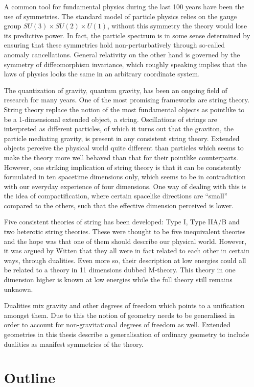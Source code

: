 A common tool for fundamental physics during the last 100 years have been the use of symmetries. The standard model of particle physics relies on the gauge group $SU(3)\times SU(2)\times U(1)$, without this symmetry the theory would lose its predictive power. In fact, the particle spectrum is in some sense determined by ensuring that these symmetries hold non-perturbatively through so-called anomaly cancellations. General relativity on the other hand is governed by the symmetry of diffeomorphism invariance, which roughly speaking implies that the laws of physics looks the same in an arbitrary coordinate system. 

The quantization of gravity, quantum gravity, has been an ongoing field of research for many years. One of the most promising frameworks are string theory. String theory replace the notion of the most fundamental objects as pointlike to be a 1-dimensional extended object, a string. Oscillations of strings are interpreted as different particles, of which it turns out that the graviton, the particle mediating gravity, is present in any consistent string theory. Extended objects perceive the physical world quite different than particles which seems to make the theory more well behaved than that for their pointlike counterparts. However, one striking implication of string theory is that it can be consistently formulated in ten spacetime dimensions only, which seems to be in contradiction with our everyday experience of four dimensions. One way of dealing with this is the idea of compactification, where certain spacelike directions are ``small'' compared to the others, such that the effective dimension perceived is lower. 

Five consistent theories of string has been developed: Type I, Type IIA/B and two heterotic string theories. These were thought to be five inequivalent theories and the hope was that one of them should describe our physical world. However, it was argued by Witten \cite{WittenDualities1995} that they all were in fact related to each other in certain ways, through dualities. Even more so, their description at low energies could all be related to a theory in 11 dimensions dubbed M-theory. This theory in one dimension higher is known at low energies while the full theory still remains unknown.


Dualities mix gravity and other degrees of freedom which points to a unification amongst them. Due to this the notion of geometry needs to be generalised in order to account for non-gravitational degrees of freedom as well. Extended geometries in this thesis describe a generalisation of ordinary geometry to include dualities as manifest symmetries of the theory. 

\section{Outline}
